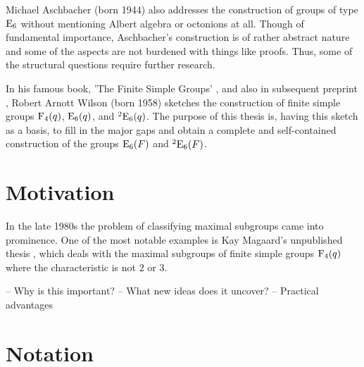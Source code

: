 Michael Aschbacher (born 1944) also addresses the 
construction of groups of type $\mathrm{E}_6$ without mentioning Albert
algebra or octonions at all. Though of fundamental importance,
Aschbacher's construction is of rather abstract nature and some
of the aspects are not burdened with things like proofs. Thus,
some of the structural questions require further research. 

In his famous book, 'The Finite Simple Groups' \cite{WilsonBook},
and also in subsequent preprint \cite{WilsonPaper},
Robert Arnott Wilson (born 1958) sketches the
construction of finite simple groups $\mathrm{F}_4(q)$, 
$\mathrm{E}_6(q)$, and ${}^2\mathrm{E}_6(q)$. The purpose of this thesis is,
having this sketch as a basis, to fill in the major gaps and 
obtain a complete and self-contained construction of the groups 
$\mathrm{E}_6(F)$ and ${}^2\mathrm{E}_6(F)$.

\section{Motivation}

In the late 1980s the problem of classifying maximal subgroups 
came into prominence. One of the most notable examples is
Kay Magaard's unpublished thesis \cite{Magaard}, which deals
with the maximal subgroups of finite simple groups $\mathrm{F}_4(q)$
where the characteristic is not $2$ or $3$. 

-- Why is this important? 
-- What new ideas does it uncover?
-- Practical advantages

\section{Notation}



